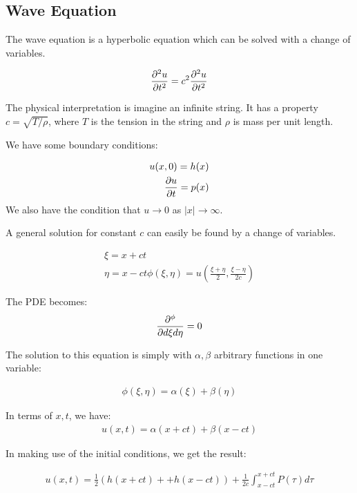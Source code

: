 \documentclass{article}
\theoremstyle{definition}
\begin{document}
\subsection{Wave Equation}

The wave equation is a hyperbolic equation which can be solved with a change of variables.

\begin{align*}
\pdv{^2u}{t^2} = c^2 \pdv{^2 u}{t^2}
\end{align*}

The physical interpretation is imagine an infinite string. It has a property $c = \sqrt{T/\rho}$, where $T$ is the tension in the string and $\rho$ is mass per unit length.

We have some boundary conditions:

\begin{align*}
u(x,0) = h(x) \\ 
\pdv{u}{t}(x,0) = p(x)
\end{align*}
We also have the condition that $u \to 0$ as $|x| \to \infty$. 

A general solution for constant $c$ can easily be found by a change of variables. 

\begin{align*}
\xi = x + ct\\
\eta = x - ct 
\phi(\xi, \eta) = u(\frac{\xi + \eta}{2}, \frac{\xi - \eta}{2c})
\end{align*}

The PDE becomes:
\begin{align*}
\pdv{^\phi}{d\xi d\eta} = 0
\end{align*}

The solution to this equation is simply with $\alpha, \beta$ arbitrary functions in one variable:

\begin{align*}
\phi(\xi, \eta) = \alpha (\xi) + \beta(\eta)
\end{align*}

In terms of $x,t$, we have:
\begin{align*}
u(x,t) = \alpha(x+ct) + \beta(x-ct)
\end{align*}

In making use of the initial conditions, we get the result:

\begin{align*}
u(x,t) = \frac{1}{2}(h(x+ct) + +h(x-ct)) + \frac{1}{2c} \int_{x-ct}^{x+ct} P(\tau) d\tau
\end{align*}
\end{document}
